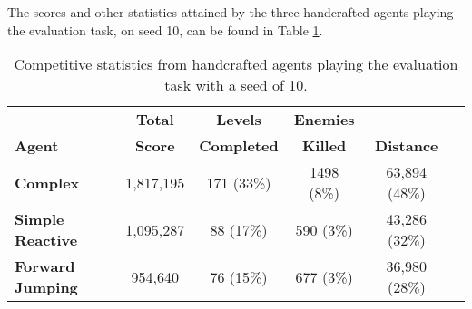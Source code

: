 The scores and other statistics attained by the three handcrafted agents playing the evaluation task, on seed 10, can be found in Table \ref{tab:hceval}.

\begin{table}
  \begin{adjustwidth}{-0cm}{-0cm}
  \begin{center} \small
    \begin{tabular}{ | l | c | c | c | c | c |}
    \hline
    & \textbf{Total} & \textbf{Levels} & \textbf{Enemies} & \Tstrut \\
    \textbf{Agent} & \textbf{Score} & \textbf{Completed} & \textbf{Killed} & \textbf{Distance} \Bstrut \\ \thickhline
    \textbf{Complex} & 1,817,195 & 171 (33\%) & 1498 (8\%) & 63,894 (48\%) \\ \hline
    \textbf{Simple Reactive} & 1,095,287 & 88 (17\%) & 590 (3\%) & 43,286 (32\%) \\ \hline
    \textbf{Forward Jumping} & 954,640 & 76 (15\%) & 677 (3\%) & 36,980 (28\%) \\ \hline

    \end{tabular}
  \end{center}
  \end{adjustwidth}
  \caption{\small Competitive statistics from handcrafted agents playing the evaluation task with a seed of 10.}
  \label{tab:hceval}
\end{table}